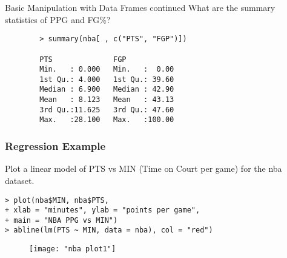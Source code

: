 \documentclass{beamer}
\begin{document}
\begin{frame}[fragile]{Basic Manipulation with Data Frames continued}
	What are the summary statistics of PPG and FG\%?
	\begin{framed}
		\vspace{-10pt}
		\begin{verbatim}
		> summary(nba[ , c("PTS", "FGP")])
		
		PTS              FGP        
		Min.   : 0.000   Min.   :  0.00  
		1st Qu.: 4.000   1st Qu.: 39.60  
		Median : 6.900   Median : 42.90  
		Mean   : 8.123   Mean   : 43.13  
		3rd Qu.:11.625   3rd Qu.: 47.60  
		Max.   :28.100   Max.   :100.00  
		\end{verbatim}
	\end{framed}
\end{frame}

\begin{frame}[fragile]\frametitle{Regression Example}
	Plot a linear model of PTS vs MIN (Time on Court per game) for the nba dataset.
	\vspace{-5pt}
	\begin{framed}
		\verb|> plot(nba$MIN, nba$PTS,|\\
		\verb|+ xlab = "minutes", ylab = "points per game",|\\
		\verb|+ main = "NBA PPG vs MIN")|\\
		\verb|> abline(lm(PTS ~ MIN, data = nba), col = "red")|
\vspace{-18pt}
\begin{figure}
\centering
\texttt{[image: "nba plot1"]}

\label{fig:nba-plot1}
\end{figure}
	\end{framed}
\end{frame}
\end{document}
